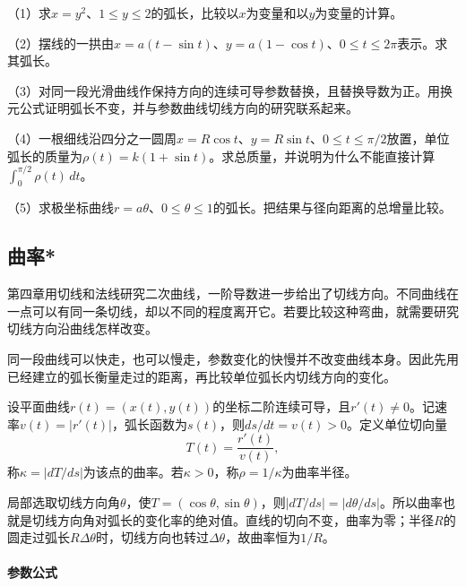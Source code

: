 \begin{exercise}
\mbox{}\par\nobreak

（1）求\(x=y^2\)、\(1\le y\le2\)的弧长，比较以\(x\)为变量和以\(y\)为变量的计算。

（2）摆线的一拱由\(x=a(t-\sin t)\)、\(y=a(1-\cos t)\)、\(0\le t\le2\pi\)表示。求其弧长。

（3）对同一段光滑曲线作保持方向的连续可导参数替换，且替换导数为正。用换元公式证明弧长不变，并与参数曲线切线方向的研究联系起来。

（4）一根细线沿四分之一圆周\(x=R\cos t\)、\(y=R\sin t\)、\(0\le t\le\pi/2\)放置，单位弧长的质量为\(\rho(t)=k(1+\sin t)\)。求总质量，并说明为什么不能直接计算\(\int_0^{\pi/2}\rho(t)\,dt\)。

（5）求极坐标曲线\(r=a\theta\)、\(0\le\theta\le1\)的弧长。把结果与径向距离的总增量比较。
\end{exercise}

\subsection{曲率*}
\label{subsec:calculus-curvature}

第四章用切线和法线研究二次曲线，一阶导数进一步给出了切线方向。不同曲线在一点可以有同一条切线，却以不同的程度离开它。若要比较这种弯曲，就需要研究切线方向沿曲线怎样改变。

同一段曲线可以快走，也可以慢走，参数变化的快慢并不改变曲线本身。因此先用已经建立的弧长衡量走过的距离，再比较单位弧长内切线方向的变化。

\begin{definition}
设平面曲线\(r(t)=(x(t),y(t))\)的坐标二阶连续可导，且\(r'(t)\ne0\)。记速率\(v(t)=|r'(t)|\)，弧长函数为\(s(t)\)，则\(ds/dt=v(t)>0\)。定义单位切向量
\begin{equation*}
 T(t)=\frac{r'(t)}{v(t)},
\end{equation*}
称\(\kappa=|dT/ds|\)为该点的{\heiti{}曲率}。若\(\kappa>0\)，称\(\rho=1/\kappa\)为{\heiti{}曲率半径}。
\end{definition}

局部选取切线方向角\(\theta\)，使\(T=(\cos\theta,\sin\theta)\)，则\(|dT/ds|=|d\theta/ds|\)。所以曲率也就是切线方向角对弧长的变化率的绝对值。直线的切向不变，曲率为零；半径\(R\)的圆走过弧长\(R\Delta\theta\)时，切线方向也转过\(\Delta\theta\)，故曲率恒为\(1/R\)。

\paragraph{参数公式} \mbox{}

